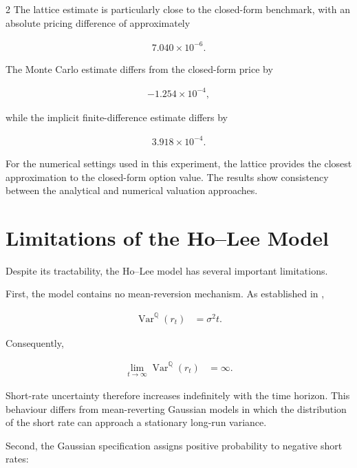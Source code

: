 \documentclass[10pt,a4paper]{article}
\newcommand{\Q}{\mathbb{Q}}
\newcommand{\Var}{\operatorname{Var}}
\numberwithin{equation}{section}
\begin{document}
\begin{multicols}{2}
The lattice estimate is particularly close to the closed-form benchmark,
with an absolute pricing difference of approximately

\begin{align*}
    7.040\times10^{-6}.
\end{align*}

The Monte Carlo estimate differs from the closed-form price by

\begin{align*}
    -1.254\times10^{-4},
\end{align*}

while the implicit finite-difference estimate differs by

\begin{align*}
    3.918\times10^{-4}.
\end{align*}

For the numerical settings used in this experiment, the lattice provides
the closest approximation to the closed-form option value. The
results show consistency between the analytical and numerical valuation
approaches.

\section{Limitations of the Ho--Lee Model}

Despite its tractability, the Ho--Lee model has several important
limitations.

First, the model contains no mean-reversion mechanism. As established in
,

\begin{align*}
    \Var^{\Q}(r_t)
    &=
    \sigma^2t.
\end{align*}

Consequently,

\begin{align*}
    \lim_{t\rightarrow\infty}
    \Var^{\Q}(r_t)
    &=
    \infty.
\end{align*}

Short-rate uncertainty therefore increases indefinitely with the time
horizon. This behaviour differs from mean-reverting Gaussian models in
which the distribution of the short rate can approach a stationary
long-run variance.

Second, the Gaussian specification assigns positive probability to
negative short rates:


\end{multicols}
\end{document}
